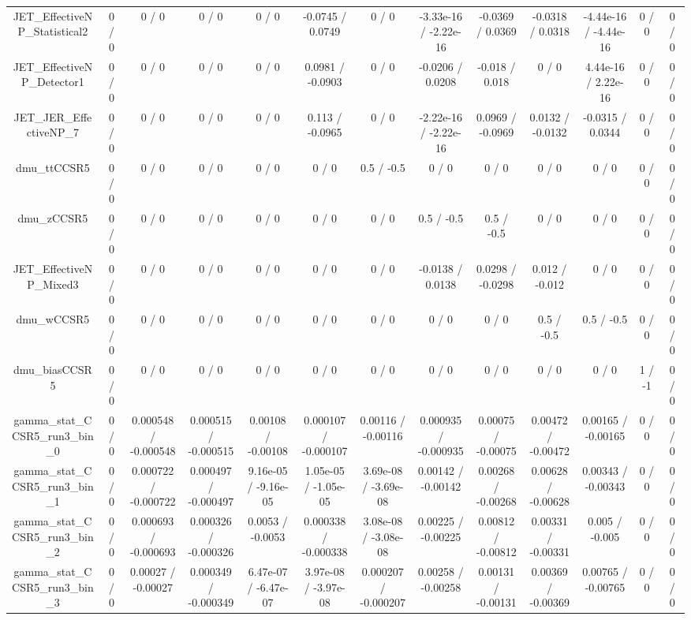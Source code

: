 \documentclass[10pt]{article}
\begin{document}
\begin{table}[htbp]
\begin{center}
\begin{tabular}{|c|c|c|c|c|c|c|c|c|c|c|c|c|}
  JET_EffectiveNP_Statistical2 & 0 / 0 & 0 / 0 & 0 / 0 & 0 / 0 & -0.0745 / 0.0749 & 0 / 0 & -3.33e-16 / -2.22e-16 & -0.0369 / 0.0369 & -0.0318 / 0.0318 & -4.44e-16 / -4.44e-16 & 0 / 0 & 0 / 0 \\ 
  JET_EffectiveNP_Detector1 & 0 / 0 & 0 / 0 & 0 / 0 & 0 / 0 & 0.0981 / -0.0903 & 0 / 0 & -0.0206 / 0.0208 & -0.018 / 0.018 & 0 / 0 & 4.44e-16 / 2.22e-16 & 0 / 0 & 0 / 0 \\ 
  JET_JER_EffectiveNP_7 & 0 / 0 & 0 / 0 & 0 / 0 & 0 / 0 & 0.113 / -0.0965 & 0 / 0 & -2.22e-16 / -2.22e-16 & 0.0969 / -0.0969 & 0.0132 / -0.0132 & -0.0315 / 0.0344 & 0 / 0 & 0 / 0 \\ 
  dmu_ttCCSR5 & 0 / 0 & 0 / 0 & 0 / 0 & 0 / 0 & 0 / 0 & 0.5 / -0.5 & 0 / 0 & 0 / 0 & 0 / 0 & 0 / 0 & 0 / 0 & 0 / 0 \\ 
  dmu_zCCSR5 & 0 / 0 & 0 / 0 & 0 / 0 & 0 / 0 & 0 / 0 & 0 / 0 & 0.5 / -0.5 & 0.5 / -0.5 & 0 / 0 & 0 / 0 & 0 / 0 & 0 / 0 \\ 
  JET_EffectiveNP_Mixed3 & 0 / 0 & 0 / 0 & 0 / 0 & 0 / 0 & 0 / 0 & 0 / 0 & -0.0138 / 0.0138 & 0.0298 / -0.0298 & 0.012 / -0.012 & 0 / 0 & 0 / 0 & 0 / 0 \\ 
  dmu_wCCSR5 & 0 / 0 & 0 / 0 & 0 / 0 & 0 / 0 & 0 / 0 & 0 / 0 & 0 / 0 & 0 / 0 & 0.5 / -0.5 & 0.5 / -0.5 & 0 / 0 & 0 / 0 \\ 
  dmu_biasCCSR5 & 0 / 0 & 0 / 0 & 0 / 0 & 0 / 0 & 0 / 0 & 0 / 0 & 0 / 0 & 0 / 0 & 0 / 0 & 0 / 0 & 1 / -1 & 0 / 0 \\ 
  gamma_stat_CCSR5_run3_bin_0 & 0 / 0 & 0.000548 / -0.000548 & 0.000515 / -0.000515 & 0.00108 / -0.00108 & 0.000107 / -0.000107 & 0.00116 / -0.00116 & 0.000935 / -0.000935 & 0.00075 / -0.00075 & 0.00472 / -0.00472 & 0.00165 / -0.00165 & 0 / 0 & 0 / 0 \\ 
  gamma_stat_CCSR5_run3_bin_1 & 0 / 0 & 0.000722 / -0.000722 & 0.000497 / -0.000497 & 9.16e-05 / -9.16e-05 & 1.05e-05 / -1.05e-05 & 3.69e-08 / -3.69e-08 & 0.00142 / -0.00142 & 0.00268 / -0.00268 & 0.00628 / -0.00628 & 0.00343 / -0.00343 & 0 / 0 & 0 / 0 \\ 
  gamma_stat_CCSR5_run3_bin_2 & 0 / 0 & 0.000693 / -0.000693 & 0.000326 / -0.000326 & 0.0053 / -0.0053 & 0.000338 / -0.000338 & 3.08e-08 / -3.08e-08 & 0.00225 / -0.00225 & 0.00812 / -0.00812 & 0.00331 / -0.00331 & 0.005 / -0.005 & 0 / 0 & 0 / 0 \\ 
  gamma_stat_CCSR5_run3_bin_3 & 0 / 0 & 0.00027 / -0.00027 & 0.000349 / -0.000349 & 6.47e-07 / -6.47e-07 & 3.97e-08 / -3.97e-08 & 0.000207 / -0.000207 & 0.00258 / -0.00258 & 0.00131 / -0.00131 & 0.00369 / -0.00369 & 0.00765 / -0.00765 & 0 / 0 & 0 / 0 \\ 

\end{tabular}
\end{center}
\end{table}
\end{document}
